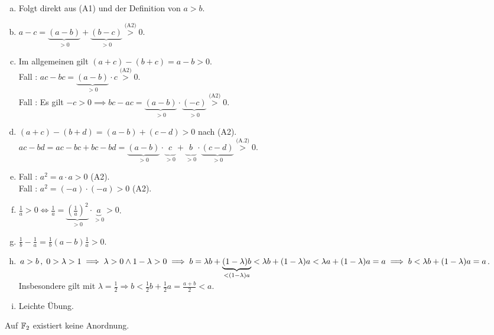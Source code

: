 \documentclass[../ana1.tex]{subfiles}
\begin{document}
\begin{bew}\leavevmode
	\begin{enumerate}[(a)]
		\item Folgt direkt aus (A1) und der Definition von \(a > b \).
		\item \(a - c = \underbrace{(a - b)}_{> 0} + \underbrace{(b - c)}_{> 0} \overset{\text{(A2)}}{>} 0 \).
		\item Im allgemeinen gilt \((a + c) - (b + c) = a - b > 0 \). \\
			  Fall : \(ac - bc = \underbrace{(a - b)}_{> 0} \cdot c \overset{\text{(A2)}}{>}0 \). \\
			  Fall : Es gilt \(\minus c > 0 \implies bc - ac = \underbrace{(a - b)}_{> 0} \cdot \underbrace{(\minus c)}_{> 0} \overset{\text{(A2)}}{>} 0 \).
		\item \((a+c)-(b+d) = (a-b)+(c-d)>0 \) nach (A2). \\
		      \(ac-bd=ac-bc+bc-bd=\underbrace{(a-b)}_{>0} \cdot \underbrace{\phantom{(}c\phantom{)}}_{>0} + \underbrace{\phantom{(}b\phantom{)}}_{>0} \cdot \underbrace{(c-d)}_{>0} \overset{\text{(A.2)}}{>}0 \).
		\item Fall : \(a^2 = a\cdot a > 0 \) (A2). \\
			  Fall : \(a^2 = (-a)\cdot(-a) > 0 \) (A2).
		\item \(\frac{1}{a} > 0 \iff \frac{1}{a} = \underbrace{{\left(\frac{1}{a}\right)}^2}_{>0} \cdot \underbrace{a}_{>0} > 0 \).
		\item \(\frac{1}{b} - \frac{1}{a} = \frac{1}{b}(a - b)\frac{1}{a} > 0 \).
		\item \(a > b\operatorname{,}  \; 0 > \lambda > 1 \implies \lambda > 0 \wedge 1 - \lambda > 0 \\
			  \implies b = \lambda b + \underbrace{(1 - \lambda)b}_{< (1 - \lambda)a} < \lambda b + (1 - \lambda) a < \lambda a + (1 - \lambda)a = a \\
			  \implies b < \lambda b + (1 - \lambda)a = a \). \\
			  Insbesondere gilt mit \(\lambda = \frac{1}{2} \Rightarrow b < \frac{1}{2} b + \frac{1}{2}a = \frac{a + b}{2} < a \).
		\item Leichte Übung.\qedhere
	\end{enumerate}
\end{bew}

\begin{bem}
	Auf \(\mathbb{F}_2 \) existiert keine Anordnung.
\end{bem}
\end{document}
